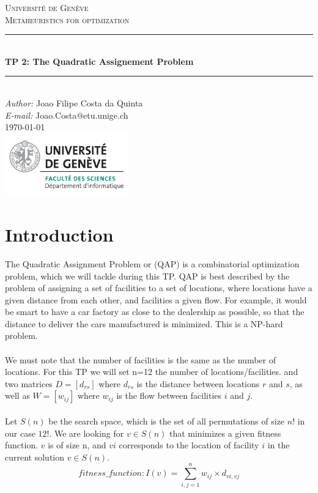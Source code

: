 \documentclass[a4paper]{article}
\makeatletter
\newcommand\TPid{2}
\newcommand\TPname{The Quadratic Assignement Problem}
\newcommand\Firstname{Joao Filipe}
\newcommand\Familyname{Costa da Quinta}
\newcommand\Email{Joao.Costa@etu.unige.ch}
\makeatother
\begin{document}
\begin{titlepage}

\newcommand{\HRule}{\rule{\linewidth}{0.5mm}} 							%

\center 
 
\textsc{\LARGE Université de Genève}\\[1cm]

\textsc{\Large Metaheuristics for optimization}\\[0.2cm]									%
\HRule \\[0.8cm]
{ \huge \bfseries TP \TPid : \TPname}\\[0.7cm]								%
\HRule \\[2cm]
\large
\emph{Author:} \Firstname \; \Familyname\\[0.5cm]		
\emph{E-mail:} {\color{blue}\Email}\\[7cm]		
{\large \today}\\[2cm]
\includegraphics[width=0.4\textwidth]{images/unige_csd.png}\\[1cm] 	%
\vfill 
\end{titlepage}


\newpage
\section{Introduction}
The Quadratic Assignment Problem or (QAP) is a combinatorial optimization problem, which we will tackle during this TP. QAP is best described by the problem of assigning a set of facilities to a set of locations, where locations have a given distance from each other, and facilities a given flow. For example, it would be smart to have a car factory as close to the dealership as possible, so that the distance to deliver the cars manufactured is minimized. This is a NP-hard problem.\\\\
We must note that the number of facilities is the same as the number of locations. For this TP we will set n=12 the number of locations/facilities. and two matrices $D = [d_{rs}]$ where $d_{rs}$ is the distance between locations $r$ and $s$, as well as $W = [w_{ij}]$ where $w_{ij}$ is the flow between facilities $i$ and $j$.\\\\
Let $S(n)$ be the search space, which is the set of all permutations of size $n!$ in our case $12!$. We are looking for $v \in S(n)$ that minimizes a given fitness function. $v$ is of size n, and $vi$ corresponds to the location of facility $i$ in the current solution $v \in S(n)$. \\
$$ fitness\_function: I(v) =  \sum_{i,j=1}^{n} w_{ij} \times d_{vi,vj} $$
\end{document}
